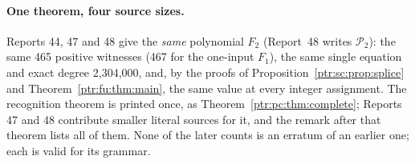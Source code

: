 \documentclass[11pt,letterpaper]{article}
\theoremstyle{definition}\newtheorem{definition}[theorem]{Definition}
\theoremstyle{remark}\newtheorem{remark}[theorem]{Remark}
\begin{document}
\paragraph{One theorem, four source sizes.} Reports 44, 47 and 48 give the
\emph{same} polynomial $F_2$ (Report~48 writes $\mathcal P_2$): the same
465 positive witnesses (467 for the one-input $F_1$), the same single
equation and exact degree 2,304,000, and, by the proofs of
Proposition~\ref{ptr:sc:prop:splice} and Theorem~\ref{ptr:fu:thm:main}, the
same value at every integer assignment. The recognition theorem is printed
once, as Theorem~\ref{ptr:pc:thm:complete}; Reports 47 and 48 contribute
smaller literal sources for it, and the remark after that theorem lists all
of them. None of the later counts is an erratum of an earlier one; each is
valid for its grammar.
\end{document}
